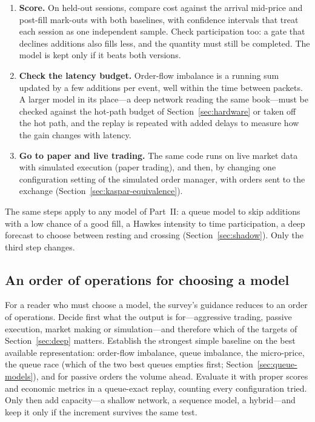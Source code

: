 \begin{enumerate}[leftmargin=1.8em,itemsep=3pt]
  queue and one thread, so the replay is deterministic (Section~\ref{sec:kaspar-determinism}): run twice, it gives the
  same fills, and any difference from the baselines is due to the gate. Each day runs as a separate process, so a year
  of sessions runs in parallel on one machine.
\item \textbf{Score.} On held-out sessions, compare cost against the arrival mid-price and post-fill mark-outs with
  both baselines, with confidence intervals that treat each session as one independent sample. Check participation too: a gate that declines additions also
  fills less, and the quantity must still be completed. The model is kept only if it beats both versions.
\item \textbf{Check the latency budget.} Order-flow imbalance is a running sum updated by a few additions per
  event, well within the time between packets. A larger model in its place---a deep network reading the same
  book---must be checked against the hot-path budget of Section~\ref{sec:hardware} or taken off the hot path, and the
  replay is repeated with added delays to measure how the gain changes with latency.
\item \textbf{Go to paper and live trading.} The same code runs on live market data with simulated execution (paper
  trading), and then, by changing one configuration setting of the simulated order manager, with orders sent to the
  exchange (Section~\ref{sec:kaspar-equivalence}).
\end{enumerate}
The same steps apply to any model of Part~II: a queue model to skip additions with a low chance of a good fill, a
Hawkes intensity to time participation, a deep forecast to choose between resting and crossing
(Section~\ref{sec:shadow}). Only the third step changes.

\subsection{An order of operations for choosing a model}
\label{sec:order-ops}

For a reader who must choose a model, the survey's guidance reduces to an order of operations.
Decide first what the output is for---aggressive trading, passive execution, market making or
simulation---and therefore which of the targets of Section~\ref{sec:deep} matters. Establish the
strongest simple baseline on the best available representation: order-flow imbalance, queue
imbalance, the micro-price, the queue race (which of the two best queues empties first;
Section~\ref{sec:queue-models}), and for passive orders the volume ahead. Evaluate it with
proper scores and economic metrics in a queue-exact replay, counting every configuration tried. Only
then add capacity---a shallow network, a sequence model, a hybrid---and keep it only if the increment
survives the same test.

